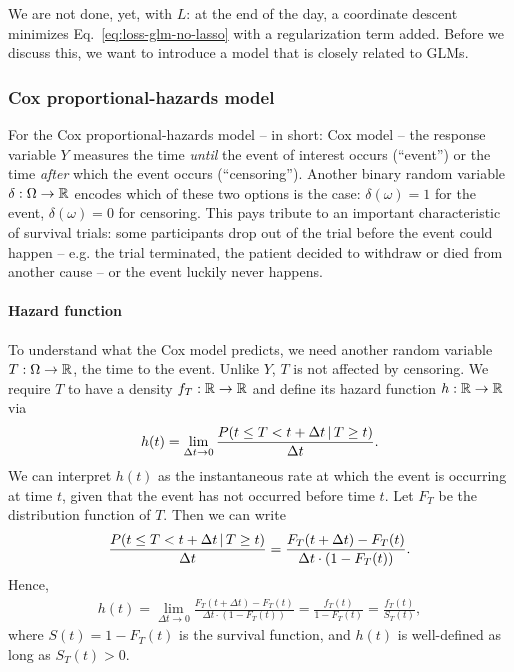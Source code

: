We are not done, yet, with $L$: at the end of the day, a coordinate descent minimizes 
Eq.\ \eqref{eq:loss-glm-no-lasso} with a regularization term added. Before we discuss this, we want 
to introduce a model that is closely related to GLMs.

\subsubsection{Cox proportional-hazards model}\label{subsubsec:cox}

For the Cox proportional-hazards model -- in short: Cox model -- the response variable $Y$ 
measures the time \textit{until} the event of interest occurs (``event'') or the time 
\textit{after} which the event occurs (``censoring''). Another binary random variable 
$\delta: \Omega \to \mathbb{R}$ encodes 
which of these two options is the case: $\delta(\omega) = 1$ for the event, $\delta(\omega) = 0$ 
for censoring. This pays tribute to an important characteristic of survival trials: some
participants drop out of the trial before the event could happen -- e.g. the trial terminated, the 
patient decided to withdraw or died from another cause -- or the event luckily never happens.

\paragraph{Hazard function} To understand what the Cox model predicts, we need another random 
variable $T: \Omega \to \mathbb{R}$, the time to the event. Unlike $Y$, $T$ is not affected by censoring. 
We require $T$ to have a density $f_T: \mathbb{R} \to \mathbb{R}$ and define its hazard function $h: \mathbb{R} \to \mathbb{R}$
via
\begin{align}
    h(t) = \lim_{\Delta t \to 0} \frac{P(t \leq T < t + \Delta t \,|\, T \geq t)}{\Delta t}.
\end{align}
We can interpret $h(t)$ as the instantaneous rate at which the event is occurring at time $t$, 
given that the event has not occurred before time $t$. Let $F_T$ be the distribution function of 
$T$. Then 
we can write
\begin{align}
    \frac{P(t \leq T < t + \Delta t \,|\, T \geq t)}{\Delta t} = 
    \frac{F_T(t + \Delta t) - F_T(t)}{\Delta t \cdot (1 - F_T(t))}.
\end{align}
Hence, 
\begin{align}
    h(t) = \lim_{\Delta t \to 0} \frac{F_T(t + \Delta t) - F_T(t)}{\Delta t \cdot (1 - F_T(t))} 
    = \frac{f_T(t)}{1 - F_T(t)} = \frac{f_T(t)}{S_T(t)},
\end{align}
where $S(t) = 1 - F_T(t)$ is the survival function, and $h(t)$ is well-defined as long as $S_T(t)
> 0$.

